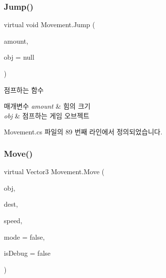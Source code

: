 \subsubsection{\texorpdfstring{Jump()}{Jump()}}
{\footnotesize\ttfamily virtual void Movement.\+Jump (\begin{DoxyParamCaption}\item[{float}]{amount,  }\item[{Game\+Object}]{obj = {\ttfamily null} }\end{DoxyParamCaption})\hspace{0.3cm}{\ttfamily [virtual]}}



점프하는 함수 


\begin{DoxyParams}{매개변수}
{\em amount} & 힘의 크기 \\
\hline
{\em obj} & 점프하는 게임 오브젝트 \\
\hline
\end{DoxyParams}


Movement.\+cs 파일의 89 번째 라인에서 정의되었습니다.


\begin{DoxyCode}{0}

\end{DoxyCode}
\mbox{\label{class_movement_ad400f155e0556a5e22a74cb77858460a}} 
\subsubsection{\texorpdfstring{Move()}{Move()}\hspace{0.1cm}{\footnotesize\ttfamily [1/2]}}
{\footnotesize\ttfamily virtual Vector3 Movement.\+Move (\begin{DoxyParamCaption}\item[{Transform}]{obj,  }\item[{Vector3}]{dest,  }\item[{float}]{speed,  }\item[{bool}]{mode = {\ttfamily false},  }\item[{bool}]{is\+Debug = {\ttfamily false} }\end{DoxyParamCaption})\hspace{0.3cm}{\ttfamily [virtual]}}



